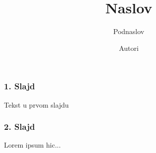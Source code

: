 \documentclass[pdf]{beamer}
\title{Naslov}
\subtitle{Podnaslov}
\author{Autori}
\begin{document}
\begin{frame}
\titlepage
\end{frame}

\begin{frame}
\frametitle{1. Slajd}

Tekst u prvom slajdu

\end{frame}

\begin{frame}
\frametitle{2. Slajd}

Lorem ipsum hic...

\end{frame}
\end{document}

